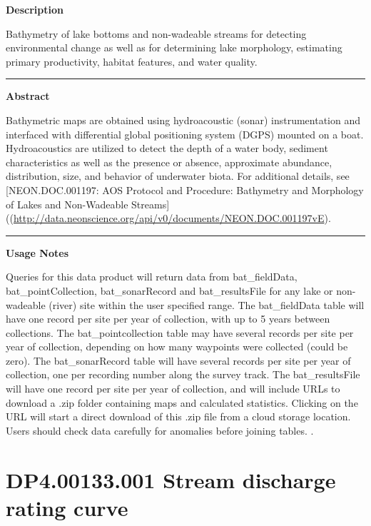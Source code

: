 \documentclass[]{article}
\begin{document}
\textbf{Description}

Bathymetry of lake bottoms and non-wadeable streams for detecting
environmental change as well as for determining lake morphology,
estimating primary productivity, habitat features, and water quality.

\begin{center}\rule{0.5\linewidth}{\linethickness}\end{center}

\textbf{Abstract}

Bathymetric maps are obtained using hydroacoustic (sonar)
instrumentation and interfaced with differential global positioning
system (DGPS) mounted on a boat. Hydroacoustics are utilized to detect
the depth of a water body, sediment characteristics as well as the
presence or absence, approximate abundance, distribution, size, and
behavior of underwater biota. For additional details, see
{[}NEON.DOC.001197: AOS Protocol and Procedure: Bathymetry and
Morphology of Lakes and Non-Wadeable
Streams{]}((\url{http://data.neonscience.org/api/v0/documents/NEON.DOC.001197vE}).

\begin{center}\rule{0.5\linewidth}{\linethickness}\end{center}

\textbf{Usage Notes}

Queries for this data product will return data from bat\_fieldData,
bat\_pointCollection, bat\_sonarRecord and bat\_resultsFile for any lake
or non-wadeable (river) site within the user specified range. The
bat\_fieldData table will have one record per site per year of
collection, with up to 5 years between collections. The
bat\_pointcollection table may have several records per site per year of
collection, depending on how many waypoints were collected (could be
zero). The bat\_sonarRecord table will have several records per site per
year of collection, one per recording number along the survey track. The
bat\_resultsFile will have one record per site per year of collection,
and will include URLs to download a .zip folder containing maps and
calculated statistics. Clicking on the URL will start a direct download
of this .zip file from a cloud storage location. Users should check data
carefully for anomalies before joining tables. \newpage
.

\section{DP4.00133.001 Stream discharge rating
curve}\label{dp4.00133.001-stream-discharge-rating-curve}
\end{document}
